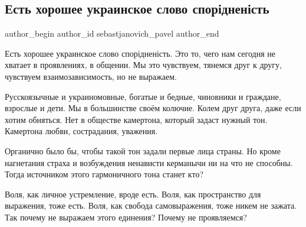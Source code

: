  
 
 
 
 
 
\subsection{Есть хорошее украинское слово спорідненість}
\label{sec:14_01_2022.fb.sebastjanovich_pavel.1.sporidnenist}
 
\ifcmt
 author_begin
   author_id sebastjanovich_pavel
 author_end
\fi

Есть хорошее украинское слово спорідненість. Это то, чего нам сегодня не
хватает в проявлениях, в общении. Мы это чувствуем, тянемся друг к другу,
чувствуем взаимозависимость, но не выражаем. 

Русскоязычные и украиномовные, богатые и бедные, чиновники и граждане, взрослые
и дети. Мы в большинстве своём колючие. Колем друг друга, даже если хотим
обняться. Нет в обществе камертона, который задаст нужный тон. Камертона любви,
сострадания, уважения.

Органично было бы, чтобы такой тон задали первые лица страны. Но кроме
нагнетания страха и возбуждения ненависти керманычи ни на что не способны.
Тогда источником этого гармоничного тона станет кто?

Воля, как личное устремление, вроде есть. Воля, как пространство для выражения,
тоже есть. Воля, как свобода самовыражения, тоже никем не зажата. Так почему не
выражаем этого единения? Почему не проявляемся?

